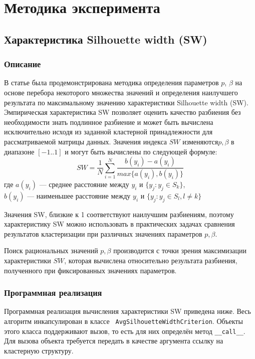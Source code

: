 \documentclass[12pt,twoside,a4paper,tikz,border=5]{refart}
\begin{document}
	\section{Методика эксперимента}
		\subsection{Характеристика Silhouette width (SW)}
			\subsubsection{Описание}
				В статье \cite{choose-pb} была продемонстрирована методика определения параметров $ p $, $ \beta $ на основе перебора некоторого множества значений и определения наилучшего результата по максимальному значению характеристики Silhouette width (SW). Эмпирическая характеристика SW позволяет оценить качество разбиения без необходимости знать подлинное разбиение и может быть вычислена исключительно исходя из заданной кластерной принадлежности для рассматриваемой матрицы данных. Значения индекса $ SW $ изменяются$ p, \beta $ в диапазоне $ [-1..1] $ и могут быть вычислены по следующей формуле:
				\begin{equation}
					SW = \dfrac{1}{N}\sum_{i=1}^{N}\dfrac{b(y_i)-a(y_i)}{max\{a(y_i),b(y_i)\}}
				\end{equation}
				\noindent где $ a(y_i) $ --- среднее расстояние между $ y_i $ и $ \{y_j:y_j \in S_k\} $,\\
				\phantom{где\space}$b(y_i)$ --- наименьшее расстояние между $ y_i $ и $ \{y_j:y_j \in S_l, l\neq k \} $
				
				Значения  SW, близкие к 1 соответствуют наилучшим разбиениям, поэтому характеристику SW можно использовать в практических задачах сравнения результатов кластеризации при различных значениях параметров $ p,\beta $.
				
				Поиск рациональных значений $ p, \beta $ производится с точки зрения максимизации характеристики $ SW $, которая вычислена относительно результата разбиения, полученного при фиксированных значениях параметров.
			\subsubsection{Программная реализация}
				Программная реализация вычисления характеристики SW приведена ниже. Весь алгоритм инкапсулирован в классе \texttt{ AvgSilhouetteWidthCriterion}. Объекты этого класса поддерживают вызов, то есть для них определён метод \texttt{\_\_call\_\_}. Для вызова объекта требуется передать в качестве аргумента ссылку на кластерную структуру.
				\newpage
							
\end{document}

